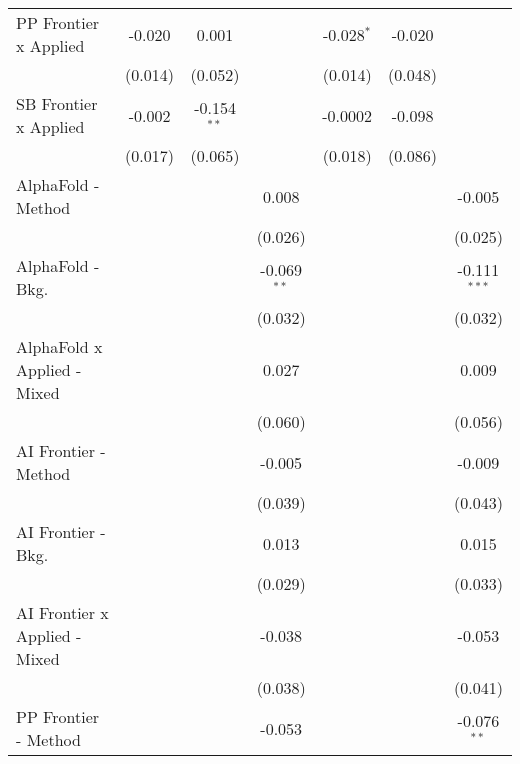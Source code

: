 \begin{tabular}{lcccccc}
   PP Frontier x Applied          & -0.020        & 0.001         &               & -0.028$^{*}$  & -0.020  &   \\   
                                  & (0.014)       & (0.052)       &               & (0.014)       & (0.048) &   \\   
   SB Frontier x Applied          & -0.002        & -0.154$^{**}$ &               & -0.0002       & -0.098  &   \\   
                                  & (0.017)       & (0.065)       &               & (0.018)       & (0.086) &   \\   
   AlphaFold - Method             &               &               & 0.008         &               &         & -0.005\\   
                                  &               &               & (0.026)       &               &         & (0.025)\\   
   AlphaFold - Bkg.               &               &               & -0.069$^{**}$ &               &         & -0.111$^{***}$\\   
                                  &               &               & (0.032)       &               &         & (0.032)\\   
   AlphaFold x Applied - Mixed    &               &               & 0.027         &               &         & 0.009\\   
                                  &               &               & (0.060)       &               &         & (0.056)\\   
   AI Frontier - Method           &               &               & -0.005        &               &         & -0.009\\   
                                  &               &               & (0.039)       &               &         & (0.043)\\   
   AI Frontier - Bkg.             &               &               & 0.013         &               &         & 0.015\\   
                                  &               &               & (0.029)       &               &         & (0.033)\\   
   AI Frontier x Applied - Mixed  &               &               & -0.038        &               &         & -0.053\\   
                                  &               &               & (0.038)       &               &         & (0.041)\\   
   PP Frontier - Method           &               &               & -0.053        &               &         & -0.076$^{**}$\\   

\end{tabular}
